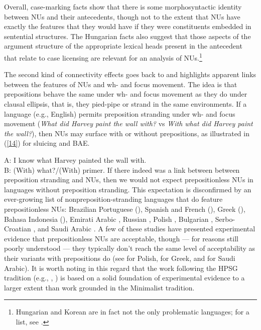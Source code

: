 \documentclass[output=paper
                ,modfonts
                ,nonflat
	        ,collection
	        ,collectionchapter
	        ,collectiontoclongg
 	        ,biblatex
                ,babelshorthands
                ,newtxmath
                ,draftmode
                ,colorlinks, citecolor=brown
]{./langsci/langscibook}
\begin{document}
{Overall, case-marking facts show that there is some morphosyntactic identity between NUs and their antecedents, though not to the extent that NUs have exactly the features that they would have if they were constituents embedded in sentential structures. The Hungarian facts also suggest that those aspects of the argument structure of the appropriate lexical heads present in the antecedent that relate to case licensing are relevant for an analysis of NUs.\footnote{Hungarian and Korean are in fact not the only problematic languages; for a list, see \citet{Vicente2015}.}

The second kind of connectivity effects goes back to \citet{Merchant2001, Merchant2005a} and highlights apparent links between the features of NUs and wh- and focus movement. The idea is that prepositions behave the same under wh- and focus movement as they do under clausal ellipsis, that is, they pied-pipe or strand in the same environments. If a language (e.g., English) permits preposition stranding under wh- and focus movement (\emph{What did Harvey paint the wall with?} vs \emph{With what did Harvey paint the wall?}), then NUs may surface with or without prepositions, as illustrated in (\ref{14}) for sluicing and BAE.

\ea A: I know what Harvey painted the wall with.\\B: (With) what?/(With) primer.\label{14}\z
If there indeed was a link between between preposition stranding and NUs, then we would not expect prepositionless NUs in languages without preposition stranding. This expectation is disconfirmed by an ever-growing list of nonpreposition-stranding languages that do feature prepositionless NUs: Brazilian Portuguese (\citealt{AlmeidaYoshida2007}), Spanish and French (\citealt{Rodrigues2006}), Greek (\citealt{Molimpakis2018}), Bahasa Indonesia (\citealt{Fortin2007}), Emirati Arabic \citep{Leung2014}, Russian \citep{Philippova2014}, Polish \citep{Szczegielniak2008, Nykiel2013, Sag2011}, %
Bulgarian \citep{Abels2017}, Serbo-Croatian \citep{Stjepanovic2008, Stjepanovic2012}, and Saudi Arabic \citep{Alshaalan2020}. A few of these studies have presented experimental evidence that prepositionless NUs are acceptable, though --- for reasons still poorly understood --- they typically don't reach the same level of acceptability as their variants with prepositions do (see \citealt{Nykiel2013} for Polish, \citealt{Molimpakis2018} for Greek, and \citealt{Alshaalan2020} for Saudi Arabic). It is worth noting in this regard that the work following the HPSG tradition (e.g., \citealt{Sag2011}, \citealt{Nykiel 2013}) is based on a solid foundation of experimental evidence to a larger extent than work grounded in the Minimalist tradition.

}
\end{document}
